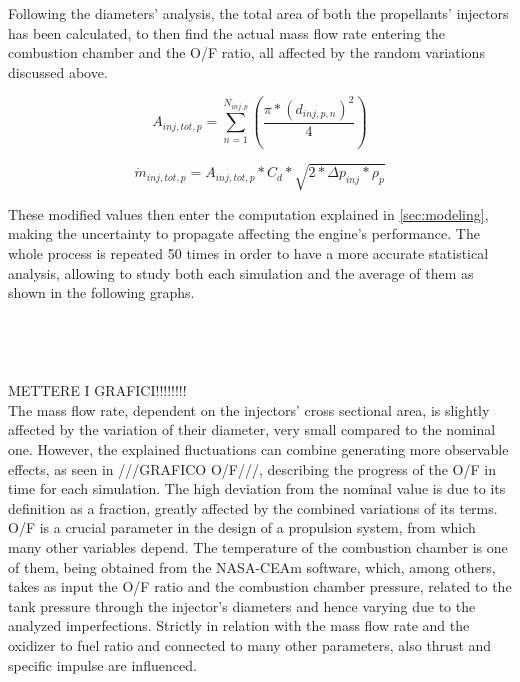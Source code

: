 Following the diameters' analysis, the total area of both the propellants' injectors has been calculated, to then find the actual mass flow rate entering the combustion chamber and the O/F ratio, all affected by the random variations discussed above. 


\begin{equation}
	A_{inj,tot,p} = \sum_{n=1}^{N_{inj,p}} \left(\frac{\pi*(d_{inj,p,n})^2}{4} \right)
    \label{eq:totalarea}
\end{equation}

\begin{equation}
    \dot m_{inj,tot,p} = A_{inj,tot,p} * C_d*\sqrt{2*\Delta p_{inj}*\rho_p}
    \label{eq:massflow}
\end{equation}

These modified values then enter the computation explained in \autoref{sec:modeling}, making the uncertainty to propagate affecting the engine's performance. The whole process is repeated 50 times in order to have a more accurate statistical analysis, allowing to study both each simulation and the average of them as shown in the following graphs.
\\
\\
\\
\\
\\


METTERE I GRAFICI!!!!!!!!\\


The mass flow rate, dependent on the injectors' cross sectional area, is slightly affected by the variation of their diameter, very small compared to the nominal one. However, the explained fluctuations can combine generating more observable effects, as seen in ///GRAFICO O/F///, describing the progress of the O/F in time for each simulation. The high deviation from the nominal value is due to its definition as a fraction, greatly affected by the combined variations of its terms. O/F is a crucial parameter in the design of a propulsion system, from which many other variables depend. The temperature of the combustion chamber is one of them, being obtained from the NASA-CEAm software, which, among others, takes as input the O/F ratio and the combustion chamber pressure, related to the tank pressure through the injector's diameters and hence varying due to the analyzed imperfections. Strictly in relation with the mass flow rate and the oxidizer to fuel ratio and connected to many other parameters, also thrust and specific impulse are influenced.

